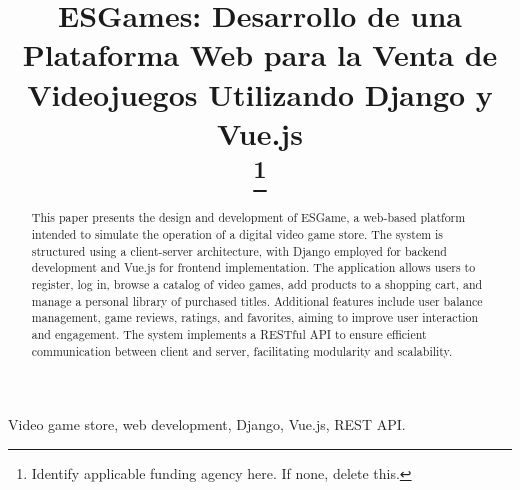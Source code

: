 \documentclass[conference]{IEEEtran}
\begin{document}
\title{ESGames: Desarrollo de una Plataforma Web para la Venta de Videojuegos Utilizando Django y Vue.js\\

\thanks{Identify applicable funding agency here. If none, delete this.}
}

\author{
\and
{}
\and
{}
\and

}

\maketitle

\begin{abstract}
This paper presents the design and development of ESGame, a web-based platform intended to simulate the operation of a digital video game store. The system is structured using a client-server architecture, with Django employed for backend development and Vue.js for frontend implementation. The application allows users to register, log in, browse a catalog of video games, add products to a shopping cart, and manage a personal library of purchased titles. Additional features include user balance management, game reviews, ratings, and favorites, aiming to improve user interaction and engagement. The system implements a RESTful API to ensure efficient communication between client and server, facilitating modularity and scalability. 
\end{abstract}

\begin{IEEEkeywords}
Video game store, web development, Django, Vue.js, REST API.
\end{IEEEkeywords}
\end{document}
